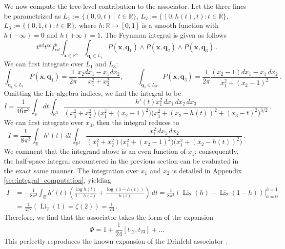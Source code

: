 \documentclass[11pt]{article}
\newcommand{\R}{\mathbb{R}}
\numberwithin{equation}{section}
\begin{document}
We now compute the tree-level contribution to the associator. Let the three lines be parametrized as $L_1:=\{(0,0,t)\mid t\in\mathbb R\}$,  $L_2:=\{(0,h(t),t):t\in\mathbb R\}$, $L_3:=\{(0,1,t):t\in\mathbb R\}$, where $h:\mathbb R\to[0,1]$ is a smooth function with $h(-\infty)=0$ and $h(+\infty)=1$. The Feynman integral is given as follows
\begin{equation}
t^{ad}t^{ec}f_{ed}^b\int_{\boldsymbol{x}\in \R^3}\int_{\boldsymbol{q}_i \in L_i}P(\boldsymbol{x},\boldsymbol{q}_1)\wedge P(\boldsymbol{x},\boldsymbol{q}_2)\wedge P(\boldsymbol{x},\boldsymbol{q}_3)\,.
\end{equation}
We can first integrate over $L_1$ and $L_3$:
\begin{equation}
\int_{\boldsymbol{q}_1 \in L_1}P(\boldsymbol{x},\boldsymbol{q}_1)=\frac{1}{2\pi}\frac{x_2dx_1-x_1dx_2}{x_1^2+x_2^2},
\qquad
\int_{\boldsymbol{q}_3 \in L_3}P(\boldsymbol{x},\boldsymbol{q}_3)=\frac{1}{2\pi}\frac{(x_2-1)dx_1-x_1\,dx_2}{x_1^2+(x_2-1)^2}\,.
\end{equation}
Omitting the Lie algebra indices, we find the integral to be
\begin{equation}
I = \frac{1}{16\pi^3}\int_{\mathbb R}dt \int_{\mathbb R^3}\frac{h'(t)x_1^2\,dx_1\,dx_2\,dx_3} {(x_1^2+x_2^2)\bigl(x_1^2+(x_2-1)^2\bigr)\bigl(x_1^2+(x_2-h(t))^2+(x_3-t)^2\bigr)^{3/2}}\,. 
\end{equation} 
We can first integrate over $x_3$, then the integral reduces to
\begin{equation} 
I = \frac{1}{8\pi^3}\int_{\mathbb R}h'(t)\,dt\int_{\mathbb R^2}\frac{x_1^2\,dx_1\,dx_2} {(x_1^2+x_2^2)\bigl(x_1^2+(x_2-1)^2\bigr)\bigl(x_1^2+(x_2-h(t))^2\bigr)}\,. 
\end{equation}
We comment that the integrand above is an even function of $x_1$; consequently, the half-space integral encountered in the previous section can be evaluated in the exact same manner. The integration over $x_1$ and $x_2$ is detailed in Appendix \ref{sec:integral_computation}, yielding
\begin{equation}
\begin{aligned}
I&= -\frac{1}{8\pi^2}\int_{\mathbb R}h'(t)\left(\frac{\log h(t)}{1-h(t)}+\frac{\log(1-h(t))}{h(t)}\right)\,dt
=\frac{1}{8\pi^2}(\operatorname{Li}_2(h)-\operatorname{Li}_2(1-h))|_{h=0}^{h=1}\\
&=\frac{1}{4\pi^2}(\operatorname{Li}_2(1) = \zeta(2)) = \frac{1}{24}\,.
\end{aligned}
\end{equation}
Therefore, we find that the associator takes the form of the expansion
\begin{equation}
	\Phi = 1 + \frac{1}{24} [t_{12},t_{23}] + \dots
\end{equation}
This perfectly reproduces the known expansion of the Drinfeld associator \cite{Drinfeld1990Quasitriangular}. 
\end{document}
